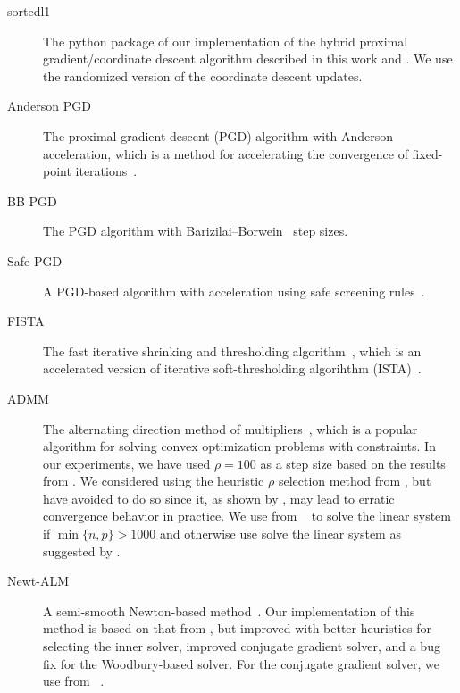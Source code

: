 \documentclass[article]{jss}
\begin{document}
\begin{description}
  \item[sortedl1] The python package of our implementation of the hybrid
        proximal gradient/coordinate descent algorithm described in this work and
        \citet{larsson2023}. We use the randomized version of the coordinate descent
        updates.

  \item[Anderson PGD] The proximal gradient descent (PGD) algorithm with Anderson acceleration, which is a
        method for accelerating the convergence of fixed-point
        iterations~\citep{anderson1965,zhang2020}.
  \item[BB PGD] The PGD algorithm with Barizilai--Borwein~\citep{barzilai1988} step sizes.

  \item[Safe PGD] A PGD-based algorithm with acceleration using safe screening
        rules~\citep{elvira2023}.

  \item[FISTA] The fast iterative shrinking and thresholding
        algorithm~\citep{beck2009}, which is an accelerated version of iterative
        soft-thresholding algorihthm (ISTA)~\citep{wright2009}.

  \item[ADMM] The alternating direction method of
        multipliers~\citep{glowinski1975,boyd2010}, which is a popular algorithm
        for solving convex optimization problems with constraints. In our experiments,
        we have used \(\rho = 100\) as a step size based on the
        results from \citet{larsson2023}.
        We considered using the heuristic \(\rho\) selection method from
        \citet{boyd2010}, but have avoided to do so since it, as shown by \citet{larsson2023},
        may lead to erratic convergence behavior in practice. We use 
        from ~\citep{virtanen2020} to solve the linear system if
        \(\min\{n, p\} > \num{1000}\) and otherwise use solve the linear system
        as suggested by \citet{boyd2010}.

  \item[Newt-ALM] A semi-smooth Newton-based method~\citep{luo2019}. Our
        implementation of this method is based on that from \citet{larsson2023},
        but improved with better heuristics for selecting the inner solver,
        improved conjugate gradient solver, and
        a bug fix for the Woodbury-based solver. For the conjugate gradient solver,
        we use  from ~\citep{virtanen2020}.


\end{description}
\end{document}
